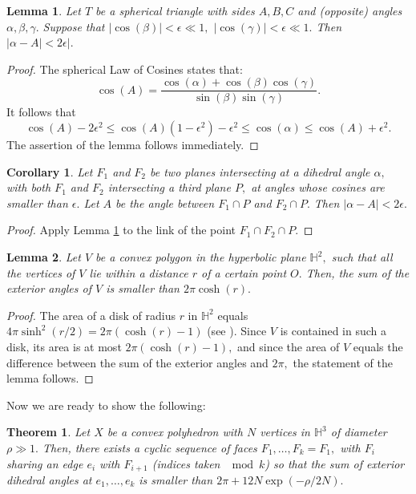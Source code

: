 \documentclass[12pt]{amsart}
\newtheorem{theorem}{Theorem}
\newtheorem{lemma}{Lemma}
\newtheorem{corollary}{Corollary}
\theoremstyle{remark}
\begin{document}
\begin{lemma}
\label{spherical}
Let $T$ be a spherical triangle with sides $A,B,C$ and (opposite) angles $\alpha, \beta, \gamma.$ Suppose that $|\cos(\beta)| < \epsilon \ll 1,$ $| \cos(\gamma)| < \epsilon \ll 1.$ Then 
$|\alpha - A| < 2 \epsilon|.$
\end{lemma}

\begin{proof} The spherical Law of Cosines states that:
\[
\cos(A) = \dfrac{\cos(\alpha)+ \cos(\beta) \cos(\gamma)}{\sin(\beta) \sin(\gamma)}.
\]
It follows that 
\[
\cos(A) - 2\epsilon^2 \leq \cos(A)(1-\epsilon^2) - \epsilon^2  \leq \cos(\alpha) \leq \cos(A) + \epsilon^2.
\]
The assertion of the lemma follows immediately.
\end{proof}

\begin{corollary}
\label{spherecor}
Let $F_1$ and $F_2$ be two planes intersecting at a dihedral angle $\alpha,$ with both $F_1$ and $F_2$ intersecting a third plane $P,$ at angles whose cosines are smaller than $\epsilon.$ Let $A$ be the angle between $F_1 \cap P$ and $F_2 \cap P.$ Then $|\alpha - A|< 2\epsilon.$
\end{corollary}

\begin{proof}
Apply Lemma \ref{spherical} to the link of the point $F_1 \cap F_2 \cap P.$
\end{proof}

\begin{lemma}
\label{circleest}
Let $V$ be a convex polygon in the hyperbolic plane $\mathbb{H}^2,$ such that all the vertices of $V$ lie within a distance $r$ of a certain point $O.$ Then, the sum of the exterior angles of $V$ is smaller than $2\pi \cosh(r).$
\end{lemma}

\begin{proof}
The area of a disk of radius $r$ in $\mathbb{H}^2$ equals $4\pi \sinh^2(r/2) = 2\pi (\cosh(r) -1)$ (see \cite{vinberg}). 
Since $V$ is contained in such a disk, its area is at most $2\pi(\cosh(r) -1),$ and since the area of $V$ equals the difference between the sum of the exterior angles and $2\pi,$ the statement of the lemma follows.
\end{proof}

Now we are ready to show the following:
\begin{theorem}
\label{degenthm}
Let $X$ be a convex polyhedron with $N$ vertices  in $\mathbb{H}^3$ of diameter $\rho \gg 1.$ Then, there exists a cyclic sequence of faces $F_1, \dotsc, F_k = F_1,$ with $F_i$ sharing an edge $e_i$  with $F_{i+1}$ (indices taken $\mod k$) so that the sum of exterior dihedral angles at $e_1, \dotsc, e_k$ is smaller than $2\pi + 12 N  \exp(-\rho/2N).$
\end{theorem}
\end{document}
